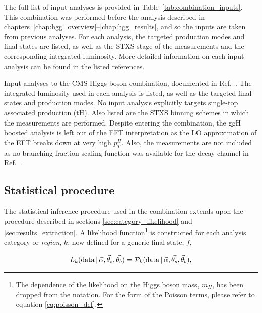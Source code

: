 The full list of input analyses is provided in Table~\ref{tab:combination_inputs}. This combination was performed before the \Hgg analysis described in chapters~\ref{chap:hgg_overview}--\ref{chap:hgg_results}, and so the \Hgg inputs are taken from previous analyses. For each analysis, the targeted production modes and final states are listed, as well as the STXS stage of the measurements and the corresponding integrated luminosity. More detailed information on each input analysis can be found in the listed references.

\begin{table}[htb!]
  \centering
  \footnotesize
  \renewcommand{\arraystretch}{1.5}
  \setlength{\tabcolsep}{2pt}
  \caption[CMS Higgs boson combination input analyses]
  {
    Input analyses to the CMS Higgs boson combination, documented in Ref.~\cite{CMS-PAS-HIG-19-005}. The integrated luminosity used in each analysis is listed, as well as the targeted final states and production modes. No input analysis explicitly targets single-top associated production (tH). Also listed are the STXS binning schemes in which the measurements are performed. Despite entering the combination, the ggH \Hbb boosted analysis is left out of the EFT interpretation as the LO approximation of the EFT breaks down at very high $p_T^H$. Also, the \Hmumu measurements are not included as no branching fraction scaling function was available for the \Hmumu decay channel in Ref.~\cite{Hays:2673969}.
  }
  \label{tab:combination_inputs}
  \hspace*{-.7cm}
  
  \hspace*{-.7cm}
\end{table}

\subsection{Statistical procedure}
The statistical inference procedure used in the combination extends upon the procedure described in sections \ref{sec:category_likelihood} and \ref{sec:results_extraction}. A likelihood function\footnote{The dependence of the likelihood on the Higgs boson mass, $m_H$, has been dropped from the notation. For the form of the Poisson terms, please refer to equation \ref{eq:poisson_def}.} is constructed for each analysis category or \textit{region}, $k$, now defined for a generic final state, $f$,

\begin{equation}
    L_k({\rm{data}}\,|\,\vec{\alpha},\vec{\theta}_s,\vec{\theta_b}) = \mathcal{P}_k( {\rm{data}}\,|\,\vec{\alpha},\vec{\theta_s},\vec{\theta}_b),
\end{equation}

